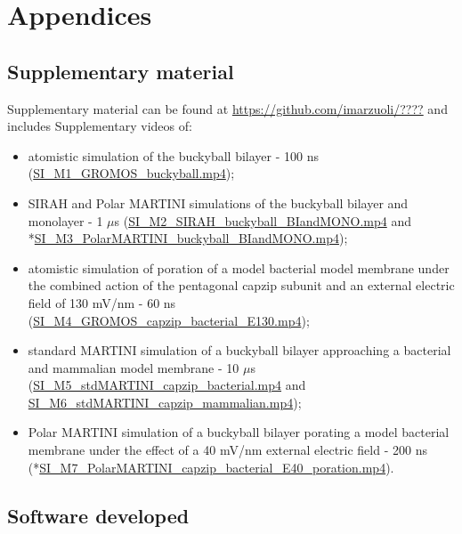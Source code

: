 
\setcounter{chapter}{-1}
\chapter{Appendices} \label{appendix}
\renewcommand{\thechapter}{A}


\section{Supplementary material}
\label{sec:SI}
Supplementary material can be found at \url{https://github.com/imarzuoli/????} and includes Supplementary videos of:
\begin{itemize}
\item atomistic simulation of the buckyball bilayer - 100 ns (\url{SI_M1_GROMOS_buckyball.mp4});
\item SIRAH and Polar MARTINI simulations of the buckyball bilayer and monolayer - 1 $\mu$s (\url{SI_M2_SIRAH_buckyball_BIandMONO.mp4} and *\url{SI_M3_PolarMARTINI_buckyball_BIandMONO.mp4});
\item atomistic simulation of poration of a model bacterial model membrane under the combined action of the pentagonal capzip subunit and an external electric field of 130 mV/nm - 60 ns (\url{SI_M4_GROMOS_capzip_bacterial_E130.mp4});
\item standard MARTINI simulation of a buckyball bilayer approaching a bacterial and mammalian model membrane - 10 $\mu$s (\url{SI_M5_stdMARTINI_capzip_bacterial.mp4} and \url{SI_M6_stdMARTINI_capzip_mammalian.mp4});
\item Polar MARTINI simulation of a buckyball bilayer porating a model bacterial membrane under the effect of a 40 mV/nm external electric field - 200 ns (*\url{SI_M7_PolarMARTINI_capzip_bacterial_E40_poration.mp4}).
\end{itemize}


\section{Software developed}
\label{sec:Appendix_software}

